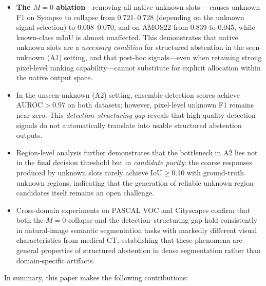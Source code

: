 \documentclass[3p,twocolumn,authoryear]{elsarticle}
\begin{document}
\begin{itemize}
  \item \textbf{The $M=0$ ablation}---removing all native unknown slots---
  causes unknown F1 on Synapse to collapse from 0.721--0.728 (depending on the
  unknown signal selection) to 0.008--0.070, and on AMOS22 from 0.839 to 0.045,
  while known-class mIoU is almost unaffected.
  This demonstrates that native unknown slots are a \emph{necessary condition}
  for structured abstention in the seen-unknown (A1) setting, and that post-hoc
  signals---even when retaining strong pixel-level ranking capability---cannot
  substitute for explicit allocation within the native output space.

  \item In the unseen-unknown (A2) setting, ensemble detection scores achieve
  AUROC$>$0.97 on both datasets; however, pixel-level unknown F1 remains near zero.
  This \emph{detection--structuring gap} reveals that high-quality detection signals
  do not automatically translate into usable structured abstention outputs.

  \item Region-level analysis further demonstrates that the bottleneck in A2 lies not
  in the final decision threshold but in \emph{candidate purity}: the coarse
  responses produced by unknown slots rarely achieve IoU$\geq$0.10 with ground-truth
  unknown regions, indicating that the generation of reliable unknown region candidates
  itself remains an open challenge.

  \item Cross-domain experiments on PASCAL VOC and Cityscapes confirm that both the
  $M{=}0$ collapse and the detection--structuring gap hold consistently in natural-image
  semantic segmentation tasks with markedly different visual characteristics from medical
  CT, establishing that these phenomena are general properties of structured abstention
  in dense segmentation rather than domain-specific artifacts.
\end{itemize}


In summary, this paper makes the following contributions:
\end{document}

